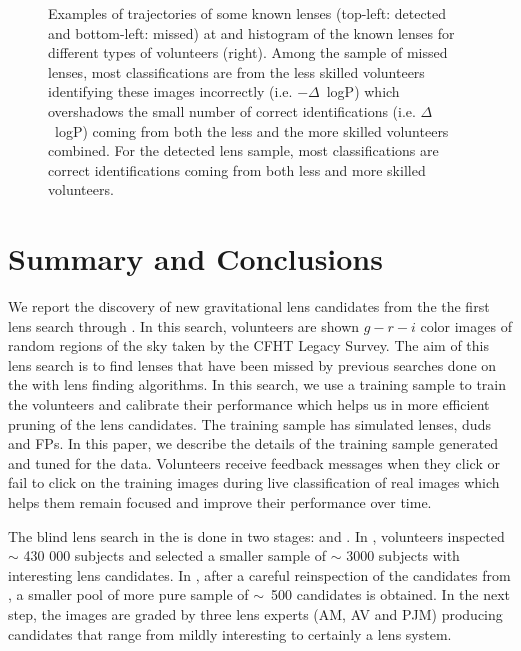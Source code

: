 \documentclass[useAMS,usenatbib,a4paper]{mn2e}
\begin{document}
\begin{figure}
\begin{center}
\caption{ \label{fig:detmis}
Examples of trajectories of some known lenses (top-left: detected and
bottom-left: missed) at \StageOne and histogram of the known lenses for
different types of volunteers (right). Among the sample of missed
lenses, most classifications are from the less skilled volunteers
identifying these images incorrectly (i.e. $-\Delta$~logP) which
overshadows the small number of correct identifications (i.e.
$\Delta$~logP) coming from both the less and the more skilled volunteers
combined. For the detected lens sample, most classifications are correct
identifications coming from both less and more skilled volunteers.
}
\end{center}
\end{figure}



\section{Summary and Conclusions}
\label{sec:conclude}

We report the discovery of new gravitational lens candidates from the
the first lens search through \sw. In this search, volunteers are shown
$g-r-i$ color images of random regions of the sky taken by the CFHT Legacy
Survey. The aim of this lens search is to find lenses that have been
missed by previous searches done on the \cfhtls with lens finding
algorithms. In this search, we use a training sample to train the
volunteers and calibrate their performance which helps us in more
efficient pruning of the lens candidates. The training sample has
simulated lenses, duds and FPs. In this paper, we describe the details
of the training sample generated and tuned for the \cfhtls data.
Volunteers receive feedback messages when they click or fail to click on
the training images during live classification of real images which
helps them remain focused and improve their performance over time.

The blind lens search in the \cfhtls is done in two stages: \StageOne and
\StageTwo. In \StageOne, volunteers inspected $\sim$ 430 000 subjects and
selected a smaller sample of $\sim$ 3000 subjects with interesting lens
candidates. In \StageTwo, after a careful reinspection of the candidates
from \StageOne, a smaller pool of more pure sample of $\sim$~500
candidates is obtained. In the next step, the images are graded by three
lens experts (AM, AV and PJM) producing candidates that range from
mildly interesting to certainly a lens system.
\end{document}
